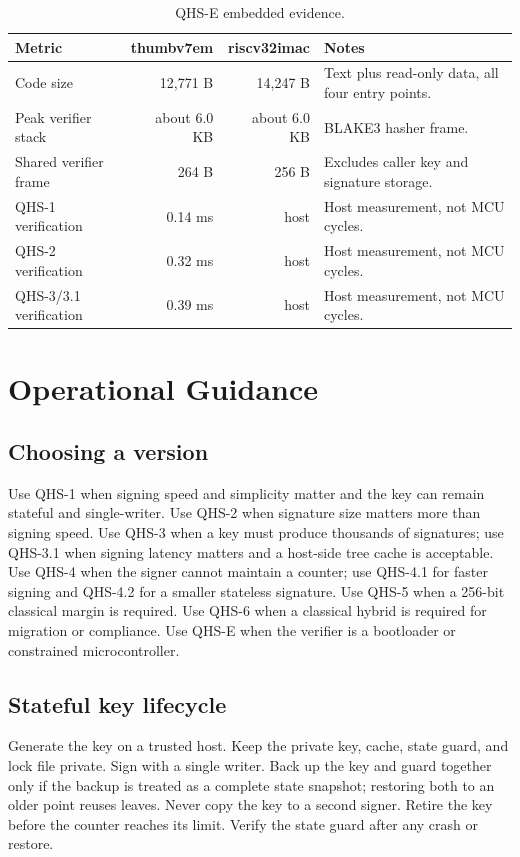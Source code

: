 \documentclass[11pt,a4paper]{article}
\begin{document}
\begin{table}[ht]
\centering
\caption{QHS-E embedded evidence.}
\label{tab:embedded}
\small
\begin{tabularx}{\textwidth}{@{}l r r Y@{}}
\toprule
Metric & thumbv7em & riscv32imac & Notes\\
\midrule
Code size & 12,771 B & 14,247 B & Text plus read-only data, all four entry points.\\
Peak verifier stack & about 6.0 KB & about 6.0 KB & BLAKE3 hasher frame.\\
Shared verifier frame & 264 B & 256 B & Excludes caller key and signature storage.\\
QHS-1 verification & 0.14 ms & host & Host measurement, not MCU cycles.\\
QHS-2 verification & 0.32 ms & host & Host measurement, not MCU cycles.\\
QHS-3/3.1 verification & 0.39 ms & host & Host measurement, not MCU cycles.\\
\bottomrule
\end{tabularx}
\end{table}
\FloatBarrier

\section{Operational Guidance}

\subsection{Choosing a version}

Use QHS-1 when signing speed and simplicity matter and the key can remain
stateful and single-writer. Use QHS-2 when signature size matters more than
signing speed. Use QHS-3 when a key must produce thousands of signatures; use
QHS-3.1 when signing latency matters and a host-side tree cache is acceptable.
Use QHS-4 when the signer cannot maintain a counter; use QHS-4.1 for faster
signing and QHS-4.2 for a smaller stateless signature. Use QHS-5 when a
256-bit classical margin is required. Use QHS-6 when a classical hybrid is
required for migration or compliance. Use QHS-E when the verifier is a
bootloader or constrained microcontroller.

\subsection{Stateful key lifecycle}

Generate the key on a trusted host. Keep the private key, cache, state guard,
and lock file private. Sign with a single writer. Back up the key and guard
together only if the backup is treated as a complete state snapshot; restoring
both to an older point reuses leaves. Never copy the key to a second signer.
Retire the key before the counter reaches its limit. Verify the state guard
after any crash or restore.
\end{document}
